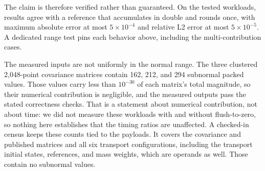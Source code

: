\documentclass[10pt]{article}
\begin{document}
The claim is therefore verified rather than guaranteed. On the tested
workloads, results agree with a reference that accumulates in double and
rounds once, with maximum absolute error at most \(5\times10^{-4}\)
and relative L2 error at most \(5\times10^{-5}\). A dedicated range test pins
each behavior above, including the multi-contribution cases.

The measured inputs are not uniformly in the normal range. The three clustered
2,048-point covariance matrices contain 162, 212, and 294 subnormal packed
values. Those values carry less than \(10^{-30}\) of each matrix's total
magnitude, so their numerical contribution is negligible, and the measured
outputs pass the stated correctness checks. That is a statement about
numerical contribution, not about time: we did not measure these workloads
with and without flush-to-zero, so nothing here establishes that the timing
ratios are unaffected. A checked-in census keeps
these counts tied to the payloads. It covers the covariance and published
matrices and all six transport configurations, including the transport initial
states, references, and mass weights, which are operands as well. Those
contain no subnormal values.
\end{document}
